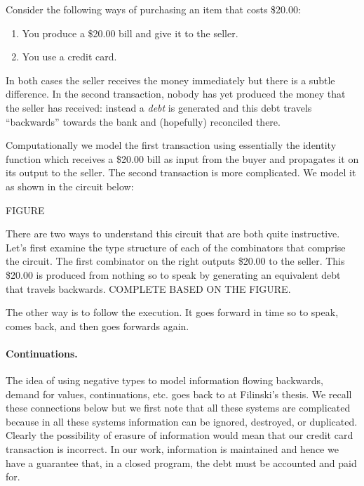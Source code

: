 \documentclass[preprint]{sigplanconf}
\begin{document}
Consider the following ways of purchasing an item that costs \$20.00:

\begin{enumerate}
\item You produce a \$20.00 bill and give it to the seller.
\item You use a credit card. 
\end{enumerate}
In both cases the seller receives the money immediately but there is a subtle
difference. In the second transaction, nobody has yet produced the money that
the seller has received: instead a \emph{debt} is generated and this debt
travels ``backwards'' towards the bank and (hopefully) reconciled there.

Computationally we model the first transaction using essentially the identity
function which receives a \$20.00 bill as input from the buyer and propagates
it on its output to the seller. The second transaction is more
complicated. We model it as shown in the circuit below:

FIGURE

There are two ways to understand this circuit that are both quite
instructive. Let's first examine the type structure of each of the
combinators that comprise the circuit. The first combinator on the right
outputs \$20.00 to the seller. This \$20.00 is produced from nothing so to
speak by generating an equivalent debt that travels backwards. COMPLETE BASED
ON THE FIGURE.

The other way is to follow the execution. It goes forward in time so to speak,
comes back, and then goes forwards again.

\paragraph*{Continuations.} The idea of using negative types to model
information flowing backwards, demand for values, continuations, etc. goes
back to at Filinski's thesis. We recall these connections below but we first
note that all these systems are complicated because in all these systems
information can be ignored, destroyed, or duplicated. Clearly the possibility
of erasure of information would mean that our credit card transaction is
incorrect. In our work, information is maintained and hence we have a
guarantee that, in a closed program, the debt must be accounted and paid for.
\end{document}
